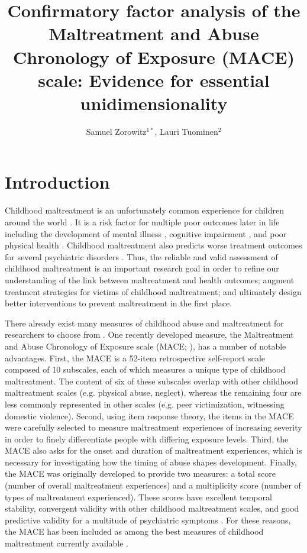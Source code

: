 \documentclass[letterpaper,man,natbib,noextraspace,floatsintext,longtable,12pt]{apa6}
\title{Confirmatory factor analysis of the Maltreatment and Abuse Chronology of Exposure (MACE) scale: Evidence for essential unidimensionality}
\author{Samuel Zorowitz$^{1*}$, Lauri Tuominen$^{2}$}
\affiliation{$^1$Princeton Neuroscience Institute, Princeton University, USA\\$^2$The Royal’s Institute of Mental Health Research, University of Ottawa, Canada}
\begin{document}
\maketitle

\section{Introduction}

Childhood maltreatment is an unfortunately common experience for children around the world \citep{stoltenborgh2015prevalence}. It is a risk factor for multiple poor outcomes later in life including the development of mental illness \citep{kessler2010childhood}, cognitive impairment \citep{su2019does}, and poor physical health \citep{wegman2009meta}. Childhood maltreatment also predicts worse treatment outcomes for several psychiatric disorders \citep{nanni2012childhood, thomas2019childhood}. Thus, the reliable and valid assessment of childhood maltreatment is an important research goal in order to refine our understanding of the link between maltreatment and health outcomes; augment treatment strategies for victims of childhood maltreatment; and ultimately design better interventions to prevent maltreatment in the first place. 

There already exist many measures of childhood abuse and maltreatment for researchers to choose from \citep{saini2019systematic}. One recently developed measure, the Maltreatment and Abuse Chronology of Exposure scale (MACE; \citealt{teicher2015maltreatment}), has a number of notable advantages. First, the MACE is a 52-item retrospective self-report scale composed of 10 subscales, each of which measures a unique type of childhood maltreatment. The content of six of these subscales overlap with other childhood maltreatment scales (e.g. physical abuse, neglect), whereas the remaining four are less commonly represented in other scales (e.g. peer victimization, witnessing domestic violence). Second, using item response theory, the items in the MACE were carefully selected to measure maltreatment experiences of increasing severity in order to finely differentiate people with differing exposure levels. Third, the MACE also asks for the onset and duration of maltreatment experiences, which is necessary for investigating how the timing of abuse shapes development. Finally, the MACE was originally developed to provide two measures: a total score (number of overall maltreatment experiences) and a multiplicity score (number of types of maltreatment experienced). These scores have excellent temporal stability, convergent validity with other childhood maltreatment scales, and good predictive validity for a multitude of psychiatric symptoms \citep{teicher2015maltreatment}. For these reasons, the MACE has been included as among the best measures of childhood maltreatment currently available \citep{saini2019systematic, georgieva2022systematic}.
\end{document}
